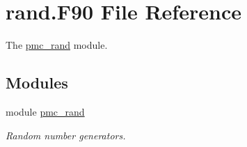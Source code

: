 \hypertarget{rand_8_f90}{}\section{rand.\+F90 File Reference}
\label{rand_8_f90}


The \mbox{\hyperlink{namespacepmc__rand}{pmc\+\_\+rand}} module.  


\subsection*{Modules}
\begin{DoxyCompactItemize}
\item 
module \mbox{\hyperlink{namespacepmc__rand}{pmc\+\_\+rand}}
\begin{DoxyCompactList}\small\item\em Random number generators. \end{DoxyCompactList}\end{DoxyCompactItemize}
